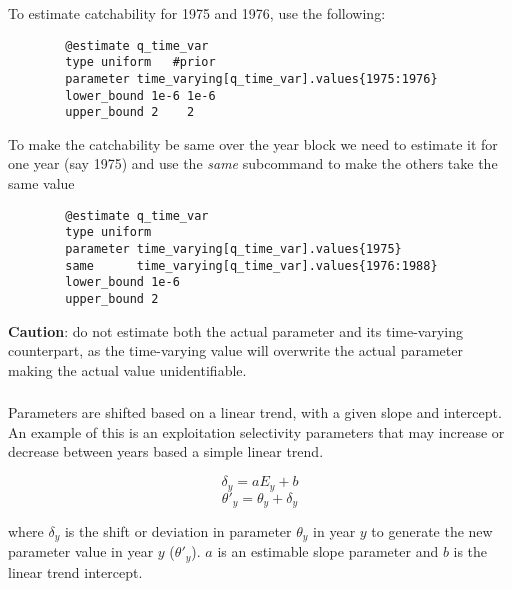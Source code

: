 To estimate catchability for 1975 and 1976, use the following:

{\small{\begin{verbatim}
		@estimate q_time_var
		type uniform   #prior
		parameter time_varying[q_time_var].values{1975:1976}
		lower_bound 1e-6 1e-6
		upper_bound 2    2
		\end{verbatim}}}

To make the catchability be same over the year block we need to estimate it for one year (say 1975) and use the \textit{same} subcommand to make the others take the same value

{\small{\begin{verbatim}
		@estimate q_time_var
		type uniform
		parameter time_varying[q_time_var].values{1975}
		same      time_varying[q_time_var].values{1976:1988}
		lower_bound 1e-6
		upper_bound 2
		\end{verbatim}}}

\textbf{Caution}: do not estimate both the actual parameter and its time-varying counterpart, as the time-varying value will overwrite the actual parameter making the actual value unidentifiable. 

\subsubsection[Linear]{}\label{sec:TimeVarying-Linear}

Parameters are shifted based on a linear trend, with a given slope and intercept. An example of this is an exploitation selectivity parameters that may increase or decrease between years based a simple linear trend.

\begin{equation}
	\delta_y = a E_y + b
\end{equation}
\begin{equation}
	\theta'_y = \theta_y + \delta_y
\end{equation}

where $\delta_y$ is the shift or deviation in parameter $\theta_y$ in year $y$ to generate the new parameter value in year $y$ ($\theta'_y$). $a$ is an estimable slope parameter and $b$ is the linear trend intercept.

\subsubsection[Exogenous]{}\label{sec:TimeVarying-Exogenous}

